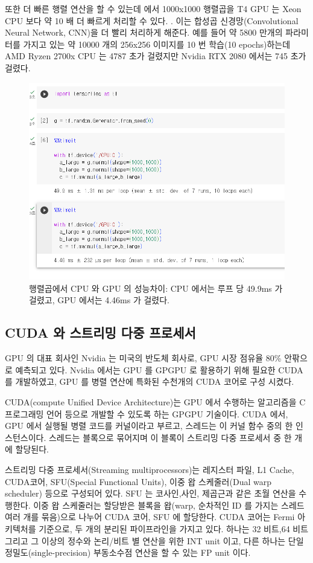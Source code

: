 또한 더 빠른 행렬 연산을 할 수 있는데 \figureautorefname{\ref{fig1}} 에서 1000x1000 행렬곱을 T4 GPU 는 Xeon CPU 보다
약 10 배 더 빠르게 처리할 수 있다. \cite{elice2022gpu}. 이는 합성곱 신경망(Convolutional Neural 
Network, CNN)을 더 빨리 처리하게 해준다. 예를 들어 약 5800 만개의 파라미터를 가지고
있는 약 10000 개의 256x256 이미지를 10 번 학습(10 epochs)하는데 AMD Ryzen 2700x CPU 는
4787 초가 걸렸지만 Nvidia RTX 2080 에서는 745 초가 걸렸다\cite{datamadness2019tensor}.
\begin{figure}[!htb]
  \centering
  \includegraphics[width=.9\textwidth]{figz/fig1.PNG}
  \caption{행렬곱에서 CPU 와 GPU 의 성능차이: CPU 에서는 루프 당 49.9ms 가 걸렸고,
GPU 에서는 4.46ms 가 걸렸다.}
  \label{fig1}
\end{figure}

\subsection{CUDA 와 스트리밍 다중 프로세서}
GPU 의 대표 회사인 Nvidia 는 미국의 반도체 회사로, GPU 시장 점유율 80\% 안팎으로
예측되고 있다\cite{yonhap2023data}. Nvidia 에서는 GPU 를 GPGPU 로 활용하기 위해 필요한 CUDA 를
개발하였고, GPU 를 병렬 연산에 특화된 수천개의 CUDA 코어로 구성 시켰다.

CUDA(compute Unified Device Architecture)는 GPU 에서 수행하는 알고리즘을 C 
프로그래밍 언어 등으로 개발할 수 있도록 하는 GPGPU 기술이다. CUDA 에서, GPU 에서
실행될 병렬 코드를 커널이라고 부르고, 스레드는 이 커널 함수 중의 한 인스턴스이다.
스레드는 블록으로 묶어지며 이 블록이 스트리밍 다중 프로세서 중 한 개에 할당된다.

스트리밍 다중 프로세서(Streaming multiprocessors)는 레지스터 파일, L1 Cache, CUDA코어,
SFU(Special Functional Units), 이중 왑 스케줄러(Dual warp scheduler) 등으로 구성되어 있다.
SFU 는 코사인,사인, 제곱근과 같은 초월 연산을 수행한다. 이중 왑 스케줄러는 할당받은
블록을 왑(warp, 순차적인 ID 를 가지는 스레드 여러 개를 묶음)으로 나누어 CUDA 코어,
SFU 에 할당한다. CUDA 코어는 Fermi 아키텍처를 기준으로, 두 개의 분리된 파이프라인을
가지고 있다. 하나는 32 비트,64 비트 그리고 그 이상의 정수와 논리/비트 별 연산을 위한 INT 
unit 이고, 다른 하나는 단일 정밀도(single-precision) 부동소수점 연산을 할 수 있는 FP 
unit 이다\cite{william2018comsys}.

